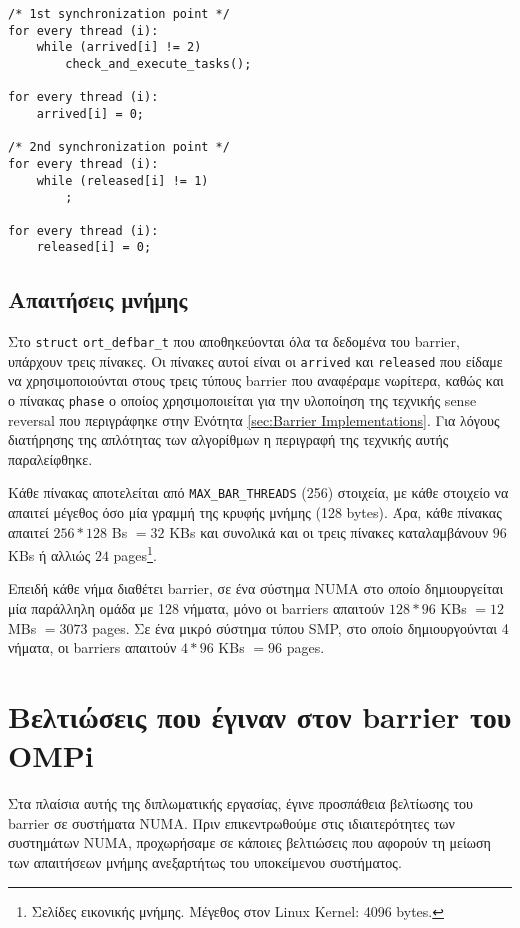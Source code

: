 \begin{lstlisting}[label=prg:tb2, caption=Task barrier για το νήμα-αρχηγό.]
/* 1st synchronization point */
for every thread (i):
    while (arrived[i] != 2)
        check_and_execute_tasks();
        
for every thread (i):
    arrived[i] = 0;
   
/* 2nd synchronization point */
for every thread (i):
    while (released[i] != 1)
        ;
        
for every thread (i):
    released[i] = 0;
\end{lstlisting}


\subsection{Απαιτήσεις μνήμης}
\label{ssec:Memory requirements of OMPi's barrier}
Στο \texttt{struct} \texttt{ort\_defbar\_t} που αποθηκεύονται όλα τα δεδομένα του barrier, υπάρχουν τρεις πίνακες. Οι πίνακες αυτοί είναι οι \texttt{arrived} και \texttt{released} που είδαμε να χρησιμοποιούνται στους τρεις τύπους barrier που αναφέραμε νωρίτερα, καθώς και ο πίνακας \texttt{phase} ο οποίος χρησιμοποιείται για την υλοποίηση της τεχνικής sense reversal που περιγράφηκε στην Ενότητα \ref{sec:Barrier Implementations}. Για λόγους διατήρησης της απλότητας των αλγορίθμων η περιγραφή της τεχνικής αυτής παραλείφθηκε.

Κάθε πίνακας αποτελείται από \texttt{MAX\_BAR\_THREADS} (256) στοιχεία, με κάθε στοιχείο να απαιτεί μέγεθος όσο μία γραμμή της κρυφής μνήμης (128 bytes). Άρα, κάθε πίνακας απαιτεί $256 * 128$ Bs $= 32$ KBs και συνολικά και οι τρεις πίνακες καταλαμβάνουν $96$ KBs ή αλλιώς $24$ pages\footnote{Σελίδες εικονικής μνήμης. Mέγεθος στον Linux Kernel: 4096 bytes.}.

Επειδή κάθε νήμα διαθέτει barrier, σε ένα σύστημα NUMA στο οποίο δημιουργείται μία παράλληλη ομάδα με 128 νήματα, μόνο οι barriers απαιτούν $128 * 96$ KBs $= 12$ MBs $= 3073$ pages. Σε ένα μικρό σύστημα τύπου SMP, στο οποίο δημιουργούνται 4 νήματα, οι barriers απαιτούν $4 * 96$ KBs $= 96$ pages.

\section{Βελτιώσεις που έγιναν στον barrier του OMPi}
\label{sec:Improvements in OMPi's barrier}
Στα πλαίσια αυτής της διπλωματικής εργασίας, έγινε προσπάθεια βελτίωσης του barrier σε συστήματα NUMA. Πριν επικεντρωθούμε στις ιδιαιτερότητες των συστημάτων NUMA, προχωρήσαμε σε κάποιες βελτιώσεις που αφορούν τη μείωση των απαιτήσεων μνήμης ανεξαρτήτως του υποκείμενου συστήματος.

